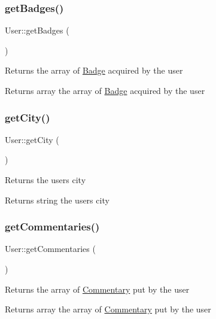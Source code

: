 \subsubsection{\texorpdfstring{get\+Badges()}{getBadges()}}
{\footnotesize\ttfamily User\+::get\+Badges (\begin{DoxyParamCaption}{ }\end{DoxyParamCaption})}

Returns the array of \hyperlink{classBadge}{Badge} acquired by the user \begin{DoxyReturn}{Returns}
array the array of \hyperlink{classBadge}{Badge} acquired by the user 
\end{DoxyReturn}
\mbox{\label{classUser_a2f3d365f258ab5eb076de5bc05352c1d}} 
\subsubsection{\texorpdfstring{get\+City()}{getCity()}}
{\footnotesize\ttfamily User\+::get\+City (\begin{DoxyParamCaption}{ }\end{DoxyParamCaption})}

Returns the user\textquotesingle{}s city \begin{DoxyReturn}{Returns}
string the user\textquotesingle{}s city 
\end{DoxyReturn}
\mbox{\label{classUser_afe55a9dab992f7ccfa9de1a8f6c908d8}} 
\subsubsection{\texorpdfstring{get\+Commentaries()}{getCommentaries()}}
{\footnotesize\ttfamily User\+::get\+Commentaries (\begin{DoxyParamCaption}{ }\end{DoxyParamCaption})}

Returns the array of \hyperlink{classCommentary}{Commentary} put by the user \begin{DoxyReturn}{Returns}
array the array of \hyperlink{classCommentary}{Commentary} put by the user 
\end{DoxyReturn}
\mbox{\label{classUser_af801acdc6910f528757a5dfaa672514f}} 

